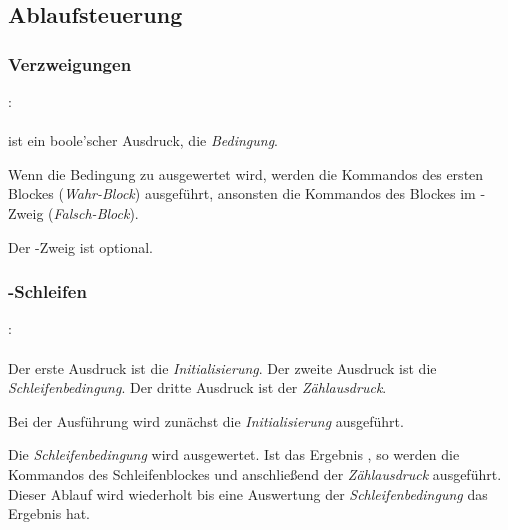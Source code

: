 \subsection{Ablaufsteuerung}\label{Ablaufsteuerung}
\subsubsection{Verzweigungen}\label{Verzweigungen}
:\label{verzweigung}\\
\hspace*{1cm}\Gspace\Gt{(}\Gspace{} \Gspace\Gt{)}\Gspace\Gt{\{}\Gspace{} \Gspace\Gt{\}}\Gspace{}\\

\glq{}\grq{} ist ein boole'scher Ausdruck, die \emph{Bedingung}.

Wenn die Bedingung zu  ausgewertet wird, werden die Kommandos des ersten Blockes (\emph{Wahr-Block}) ausgeführt,
ansonsten die Kommandos des Blockes im -Zweig (\emph{Falsch-Block}).

Der -Zweig ist optional.


\subsubsection{-Schleifen}\label{$_backslash$kw__for__-Schleifen}
:\label{schleife_for}\\
\hspace*{1cm}\Gspace\Gt{(}\Gspace{}\Gspace\Gt{;}\Gspace{}\Gspace\Gt{;}\Gspace{}\Gspace\Gt{)}\Gspace\Gt{\{}\Gspace{} \Gspace\Gt{\}}\\

Der erste Ausdruck ist die \emph{Initialisierung}. Der zweite Ausdruck ist die \emph{Schleifenbedingung}. Der dritte Ausdruck ist der \emph{Zählausdruck}.

Bei der Ausführung wird zunächst die \emph{Initialisierung} ausgeführt.

Die \emph{Schleifenbedingung} wird ausgewertet. Ist das Ergebnis , so werden die Kommandos des Schleifenblockes
und anschließend der \emph{Zählausdruck} ausgeführt.
Dieser Ablauf wird wiederholt bis eine Auswertung der \emph{Schleifenbedingung} das Ergebnis  hat.

